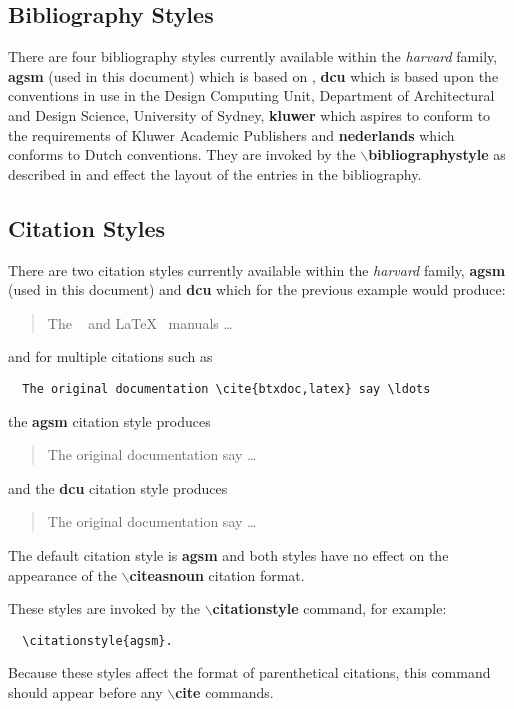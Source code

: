 \subsection{Bibliography Styles}
There are four bibliography styles currently available within the
{\em harvard} family, {\bf agsm} (used in this document) which is based on 
, {\bf dcu}
which is based upon the conventions in use in the Design Computing Unit,
Department of Architectural and Design Science, University of Sydney,
{\bf kluwer} which aspires to conform to the requirements of Kluwer Academic
Publishers and {\bf nederlands} which conforms to Dutch conventions.
They are invoked by the {\bf $\backslash$bibliographystyle} as described in
 and effect the layout of the entries in the bibliography.

\subsection{Citation Styles}
There are two citation styles currently available within the {\em harvard} 
family, {\bf agsm} (used in this document) and {\bf dcu} which for the previous
example would produce:
\begin{quote}
The \BibTeX\ \cite{btxdoc} and \LaTeX\ \cite[Annex~B]{latex} manuals \ldots
\end{quote}
and for multiple citations such as
\begin{verbatim}
  The original documentation \cite{btxdoc,latex} say \ldots
\end{verbatim}
the {\bf agsm} citation style produces
\begin{quote}
The original documentation \cite{btxdoc,latex} say \ldots
\end{quote}
and the {\bf dcu} citation style produces
\begin{quote}
The original documentation \cite{btxdoc,latex} say \ldots
\end{quote}
The default citation style is {\bf agsm} and both styles have no effect on the
appearance of the {\bf $\backslash$citeasnoun} citation format.

These styles are invoked by the {\bf $\backslash$citationstyle} command,
for example:
\begin{verbatim}
  \citationstyle{agsm}.
\end{verbatim}
Because these styles affect the format of parenthetical citations, this command 
should appear before any {\bf $\backslash$cite} commands.

